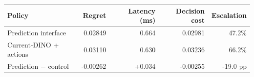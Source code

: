 \begin{tabular}{lrrrr}
\toprule
Policy & Regret & Latency (ms) & Decision cost & Escalation \\
\midrule
Prediction interface & 0.02849 & 0.664 & 0.02981 & 47.2\% \\
Current-DINO + actions & 0.03110 & 0.630 & 0.03236 & 66.2\% \\
\midrule
Prediction $-$ control & -0.00262 & +0.034 & -0.00255 & -19.0 pp \\
\bottomrule
\end{tabular}
